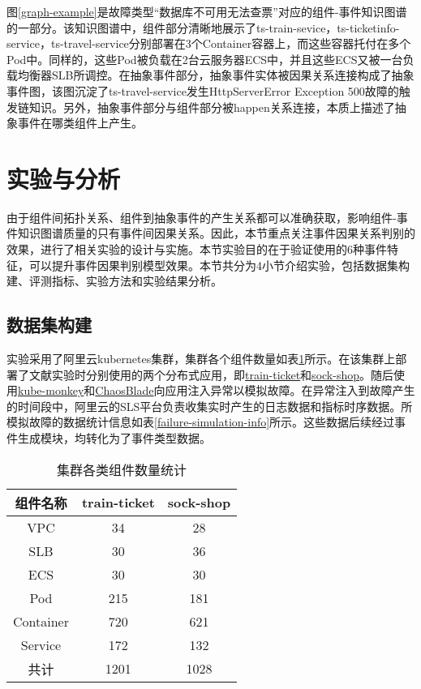图\ref{graph-example}是故障类型“数据库不可用无法查票”对应的组件-事件知识图谱的一部分。该知识图谱中，组件部分清晰地展示了ts-train-sevice，ts-ticketinfo-service，ts-travel-service分别部署在3个Container容器上，而这些容器托付在多个Pod中。同样的，这些Pod被负载在2台云服务器ECS中，并且这些ECS又被一台负载均衡器SLB所调控。在抽象事件部分，抽象事件实体被因果关系连接构成了抽象事件图，该图沉淀了ts-travel-service发生HttpServerError Exception 500故障的触发链知识。另外，抽象事件部分与组件部分被happen关系连接，本质上描述了抽象事件在哪类组件上产生。
\section{实验与分析}\label{event-cause-classidier-experiment}
由于组件间拓扑关系、组件到抽象事件的产生关系都可以准确获取，影响组件-事件知识图谱质量的只有事件间因果关系。因此，本节重点关注事件因果关系判别的效果，进行了相关实验的设计与实施。本节实验目的在于验证使用的6种事件特征，可以提升事件因果判别模型效果。本节共分为4小节介绍实验，包括数据集构建、评测指标、实验方法和实验结果分析。
\subsection{数据集构建}
实验采用了阿里云kubernetes集群，集群各个组件数量如表\ref{component-num}所示。在该集群上部署了文献\parencite{zhou2018poster,rahman2019predicting}实验时分别使用的两个分布式应用，即\href{https://github.com/FudanSELab/train-ticket}{train-ticket}和\href{https://github.com/microservices-demo/microservices-demo}{sock-shop}。随后使用\href{https://github.com/asobti/kube-monkey}{kube-monkey}和\href{https://github.com/chaosblade-io/chaosblade}{ChaosBlade}向应用注入异常以模拟故障。在异常注入到故障产生的时间段中，阿里云的SLS平台负责收集实时产生的日志数据和指标时序数据。所模拟故障的数据统计信息如表\ref{failure-simulation-info}所示。这些数据后续经过事件生成模块，均转化为了事件类型数据。
\begin{table}[htbp]
    \caption{集群各类组件数量统计}
    \label{component-num}
    \centering
    \begin{tabular}{ccc}
    \toprule[2pt]
    组件名称      & train-ticket & sock-shop        \\ \midrule[2pt]
    VPC       & 34           & 28 \\
    SLB       & 30           & 36 \\
    ECS       & 30           & 30 \\
    Pod       & 215          & 181 \\
    Container & 720          & 621 \\
    Service   & 172          & 132 \\ \midrule[1pt]
    共计   & 1201          & 1028 \\ \bottomrule[2pt]
    \end{tabular}
\end{table}

